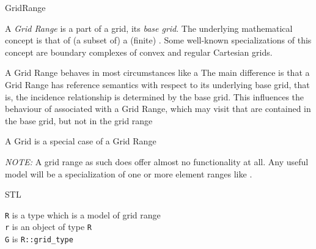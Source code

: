 \begin{Label}{GridRange}  
\end{Label}

    A {\em  Grid Range} is a part of a grid, its {\em  base grid}.
    The underlying mathematical concept
    is that of (a subset of) a (finite) 
    .
    Some well-known specializations of this concept are
    boundary complexes of convex 
    and regular Cartesian grids.

    A Grid Range behaves in most circumstances like a 
    The main difference is that a Grid Range has reference semantics with respect to
    its underlying base grid, that is, the incidence relationship is determined by the 
    base grid.
    This influences the behaviour of
    associated with a Grid Range,
    which may  visit 
    that are contained in the base grid,
    but not  in the grid range    
    
    A Grid is a special case of a Grid 
    Range  %

    {\em  NOTE:} A grid range as such does offer almost no functionality at all.
    Any useful model will be a specialization of one or more 
    element ranges 
    like     
    .

     STL 


    {\tt  R} is a type which is a model of grid range
    \\
    {\tt  r} is an object of type {\tt  R}
    \\
    {\tt G} is {\tt R::grid\_type}


